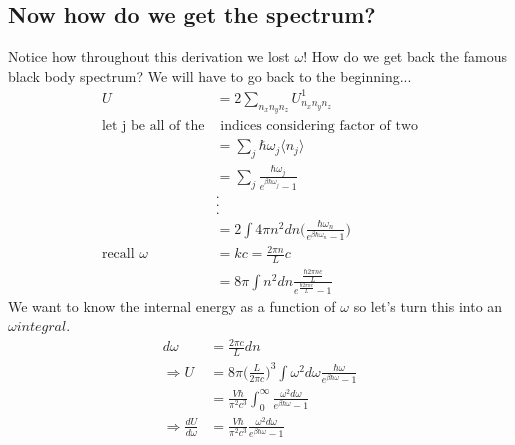 \documentclass[a4paper, 11pt]{article}
\begin{document}
\subsection*{Now how do we get the spectrum?}
	Notice how throughout this derivation we lost $\omega$! How do we get back the famous black body spectrum? We will have to go back to the beginning... 
		\begin{align*}
			U &= 2\sum\limits_{n_xn_yn_z} U_{n_xn_yn_z}^1 \\
			\text{let j be all of the}&\text{ indices considering factor of two} \\ 
			&= \sum\limits_j \hbar\omega_j\langle n_j \rangle \\
			&= \sum\limits_j \frac{\hbar \omega_j}{e^{\beta\hbar\omega_j}-1} \\ 
			&. \\
			&. \\
			&. \\
			&= 2\int 4\pi n^2 dn \Big(\frac{\hbar \omega_n}{e^{\beta\hbar\omega_n}-1}\Big)\\ 
		\text{recall } \omega &= kc = \frac{2\pi n}{L}c \\ 
			&= 8\pi\int n^2dn \frac{\frac{\hbar2\pi n c}{L}}{e^{\frac{\hbar2\pi n c}{L}}-1}
		\end{align*}
	\noindent We want to know the internal energy as a function of $\omega$ so let's turn this into an $\omega integral$. 
		\begin{align*}
			d\omega &= \frac{2\pi c}{L}dn \\ 
			\Rightarrow U &= 8\pi \Big(\frac{L}{2\pi c}\Big)^3\int \omega^2d\omega \frac{\hbar \omega}{e^{\beta\hbar\omega}-1} \\ 
			&= \frac{V\hbar}{\pi^2c^3}\int_0^\infty \frac{\omega^2d\omega}{e^{\beta\hbar\omega}-1} \\ 
			\Rightarrow \frac{dU}{d\omega} &= \frac{V\hbar}{\pi^2c^3}\frac{\omega^2d\omega}{e^{\beta\hbar\omega}-1}
		\end{align*}
\end{document}

